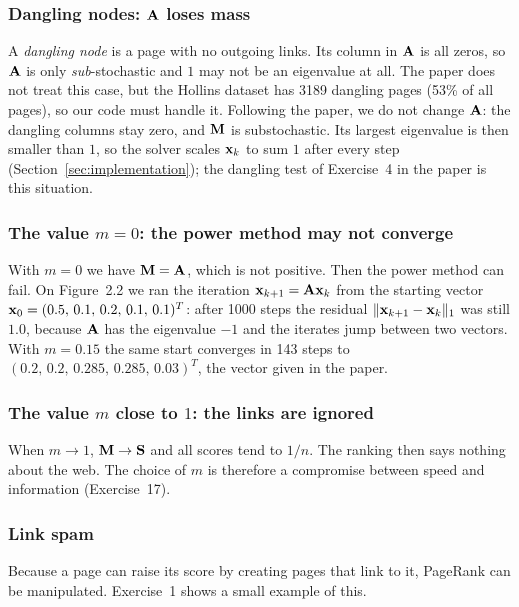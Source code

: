 \subsubsection*{Dangling nodes: $\mathbf{A}$ loses mass}

A \emph{dangling node} is a page with no outgoing links.
Its column in $\mathbf{A}$ is all zeros, so $\mathbf{A}$ is only \emph{sub}-stochastic and $1$ may not be an eigenvalue at all.
The paper does not treat this case, but the Hollins dataset has 3189 dangling pages (53\% of all pages), so our code must handle it.
Following the paper, we do not change $\mathbf{A}$: the dangling columns stay zero, and $\mathbf{M}$ is substochastic.
Its largest eigenvalue is then smaller than $1$, so the solver scales $\mathbf{x}_k$ to sum $1$ after every step (Section~\ref{sec:implementation}); the dangling test of Exercise~4 in the paper is this situation.

\subsubsection*{The value $m = 0$: the power method may not converge}

With $m = 0$ we have $\mathbf{M} = \mathbf{A}$, which is not positive.
Then the power method can fail.
On Figure~2.2 we ran the iteration $\mathbf{x}_{k+1} = \mathbf{A}\mathbf{x}_k$ from the starting vector $\mathbf{x}_0 = (0.5,\,0.1,\,0.2,\,0.1,\,0.1)^T$: after 1000 steps the residual $\|\mathbf{x}_{k+1}-\mathbf{x}_k\|_1$ was still $1.0$, because $\mathbf{A}$ has the eigenvalue $-1$ and the iterates jump between two vectors.
With $m = 0.15$ the same start converges in 143 steps to $(0.2,\,0.2,\,0.285,\,0.285,\,0.03)^T$, the vector given in the paper.

\subsubsection*{The value $m$ close to $1$: the links are ignored}

When $m \to 1$, $\mathbf{M} \to \mathbf{S}$ and all scores tend to $1/n$.
The ranking then says nothing about the web.
The choice of $m$ is therefore a compromise between speed and information (Exercise~17).

\subsubsection*{Link spam}

Because a page can raise its score by creating pages that link to it, PageRank can be manipulated.
Exercise~1 shows a small example of this.
